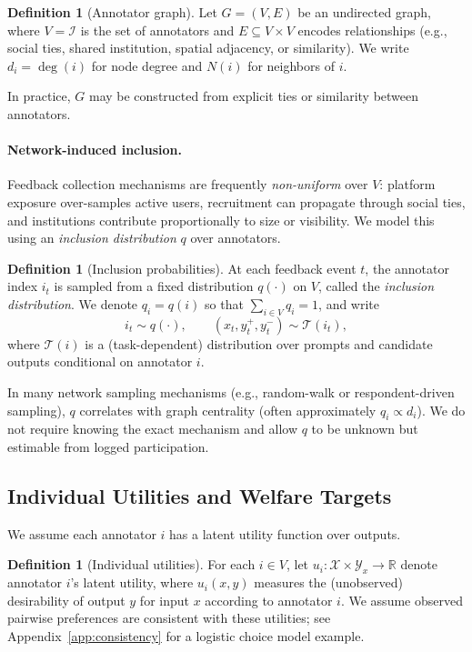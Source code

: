 \documentclass{article}
\theoremstyle{plain}
\theoremstyle{definition}
\newtheorem{definition}[theorem]{Definition}
\theoremstyle{remark}
\begin{document}
\begin{definition}[Annotator graph]
Let $G=(V,E)$ be an undirected graph, where $V=\mathcal{I}$ is the set of
annotators and $E\subseteq V\times V$ encodes relationships (e.g., social ties,
shared institution, spatial adjacency, or similarity). We write $d_i=\deg(i)$
for node degree and $N(i)$ for neighbors of $i$.
\end{definition}

In practice, $G$ may be constructed from explicit ties or similarity between annotators.

\paragraph{Network-induced inclusion.}
Feedback collection mechanisms are frequently \emph{non-uniform} over $V$:
platform exposure over-samples active users, recruitment can propagate through
social ties, and institutions contribute proportionally to size or visibility.
We model this using an \emph{inclusion distribution} $q$ over annotators.

\begin{definition}[Inclusion probabilities]
\label{def:inclusion-prob}
At each feedback event $t$, the annotator index $i_t$ is sampled from a fixed
distribution $q(\cdot)$ on $V$, called the \emph{inclusion distribution}.
We denote $q_i=q(i)$ so that $\sum_{i\in V}q_i=1$, and write
\begin{equation}
    i_t \sim q(\cdot),
    \qquad
    (x_t,y_t^+,y_t^-) \sim \mathcal{T}(i_t),
\end{equation}
where $\mathcal{T}(i)$ is a (task-dependent) distribution over prompts and
candidate outputs conditional on annotator $i$.
\end{definition}
In many network sampling mechanisms (e.g., random-walk or respondent-driven
sampling), $q$ correlates with graph centrality (often approximately
$q_i\propto d_i$). We do not require knowing the exact mechanism and allow $q$
to be unknown but estimable from logged participation.

\subsection{Individual Utilities and Welfare Targets}
\label{subsec:utilities-welfare}

We assume each annotator $i$ has a latent utility function over outputs.

\begin{definition}[Individual utilities]
For each $i\in V$, let
$u_i:\mathcal{X}\times\mathcal{Y}_x\to\mathbb{R}$ denote annotator $i$'s latent
utility, where $u_i(x,y)$ measures the (unobserved) desirability of output $y$
for input $x$ according to annotator $i$.
We assume observed pairwise preferences are consistent with these utilities; see Appendix~\ref{app:consistency} for a logistic choice model example.
\end{definition}
\end{document}
